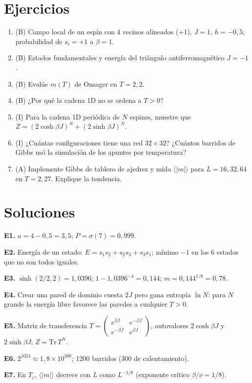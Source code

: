 \documentclass[11pt,a4paper]{article}
\begin{document}
\section{Ejercicios}
\begin{enumerate}[label=\textbf{E\arabic*.}]
\item (B) Campo local de un espín con 4 vecinos alineados ($+1$), $J=1$, $h=-0{,}5$; probabilidad de $s_i=+1$ a $\beta=1$.
\item (B) Estados fundamentales y energía del triángulo antiferromagnético $J=-1$.
\item (B) Evalúe $m(T)$ de Onsager en $T=2{,}2$.
\item (B) ¿Por qué la cadena 1D no se ordena a $T>0$?
\item (I) Para la cadena 1D periódica de $N$ espines, muestre que $Z=(2\cosh\beta J)^N+(2\sinh\beta J)^N$.
\item (I) ¿Cuántas configuraciones tiene una red $32\times32$? ¿Cuántos barridos de Gibbs usó la simulación de los apuntes por temperatura?
\item (A) Implemente Gibbs de tablero de ajedrez y mida $\langle|m|\rangle$ para $L=16,32,64$ en $T=2{,}27$. Explique la tendencia.
\end{enumerate}
\section{Soluciones}
\begin{solucion}
\textbf{E1.} $u=4-0{,}5=3{,}5$; $P=\sigma(7)=0{,}999$.

\textbf{E2.} Energía de un estado: $E=s_1s_2+s_2s_3+s_3s_1$; mínimo $-1$ en los 6 estados que no son todos iguales.

\textbf{E3.} $\sinh(2/2{,}2)=1{,}0396$; $1-1{,}0396^{-4}=0{,}144$; $m=0{,}144^{1/8}=0{,}78$.

\textbf{E4.} Crear una pared de dominio cuesta $2J$ pero gana entropía $\ln N$: para $N$ grande la energía libre favorece las paredes a cualquier $T>0$.

\textbf{E5.} Matriz de transferencia $T=\begin{pmatrix}e^{\beta J}&e^{-\beta J}\\e^{-\beta J}&e^{\beta J}\end{pmatrix}$, autovalores $2\cosh\beta J$ y $2\sinh\beta J$; $Z=\mathrm{Tr}\,T^N$.

\textbf{E6.} $2^{1024}\approx1{,}8\times10^{308}$; 1200 barridos (300 de calentamiento).

\textbf{E7.} En $T_c$, $\langle|m|\rangle$ decrece con $L$ como $L^{-1/8}$ (exponente crítico $\beta/\nu=1/8$).
\end{solucion}
\end{document}
